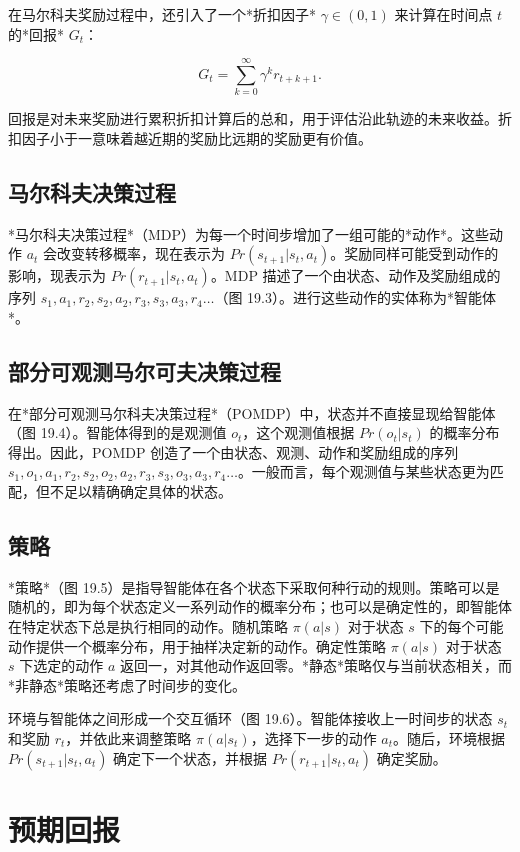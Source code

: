 在马尔科夫奖励过程中，还引入了一个*折扣因子* \(\gamma \in (0, 1)\) 来计算在时间点 \(t\) 的*回报* \(G_t\)：

\[
G_t = \sum_{k=0}^{\infty} \gamma^k r_{t+k+1}. \tag{19.1}
\]

回报是对未来奖励进行累积折扣计算后的总和，用于评估沿此轨迹的未来收益。折扣因子小于一意味着越近期的奖励比远期的奖励更有价值。

\subsection{马尔科夫决策过程}

*马尔科夫决策过程*（MDP）为每一个时间步增加了一组可能的*动作*。这些动作 \(a_t\) 会改变转移概率，现在表示为 \(Pr(s_{t+1}|s_t, a_t)\)。奖励同样可能受到动作的影响，现表示为 \(Pr(r_{t+1}|s_t, a_t)\)。MDP 描述了一个由状态、动作及奖励组成的序列 \(s_1, a_1, r_2, s_2, a_2, r_3, s_3, a_3, r_4 \ldots\)（图 19.3）。进行这些动作的实体称为*智能体*。


\subsection{部分可观测马尔可夫决策过程}
在*部分可观测马尔科夫决策过程*（POMDP）中，状态并不直接显现给智能体（图 19.4）。智能体得到的是观测值 \(o_t\)，这个观测值根据 \(Pr(o_t|s_t)\) 的概率分布得出。因此，POMDP 创造了一个由状态、观测、动作和奖励组成的序列 \(s_1, o_1, a_1, r_2, s_2, o_2, a_2, r_3, s_3, o_3, a_3, r_4 \ldots\)。一般而言，每个观测值与某些状态更为匹配，但不足以精确确定具体的状态。

\subsection{策略}
*策略*（图 19.5）是指导智能体在各个状态下采取何种行动的规则。策略可以是随机的，即为每个状态定义一系列动作的概率分布；也可以是确定性的，即智能体在特定状态下总是执行相同的动作。随机策略 \(\pi(a|s)\) 对于状态 \(s\) 下的每个可能动作提供一个概率分布，用于抽样决定新的动作。确定性策略 \(\pi(a|s)\) 对于状态 \(s\) 下选定的动作 \(a\) 返回一，对其他动作返回零。*静态*策略仅与当前状态相关，而*非静态*策略还考虑了时间步的变化。

环境与智能体之间形成一个交互循环（图 19.6）。智能体接收上一时间步的状态 \(s_t\) 和奖励 \(r_t\)，并依此来调整策略 \(\pi(a|s_t)\)，选择下一步的动作 \(a_t\)。随后，环境根据 \(Pr(s_{t+1}|s_t, a_t)\) 确定下一个状态，并根据 \(Pr(r_{t+1}|s_t, a_t)\) 确定奖励。

\section{预期回报}

